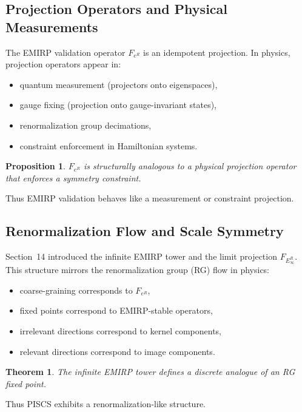 \documentclass[11pt]{article}
\theoremstyle{definition}
\theoremstyle{plain}
\newtheorem{theorem}[definition]{Theorem}
\newtheorem{proposition}[definition]{Proposition}
\theoremstyle{remark}
\begin{document}
\subsection{Projection Operators and Physical Measurements}

The EMIRP validation operator $F_{e^R}$ is an idempotent projection. In
physics, projection operators appear in:

\begin{itemize}
    \item quantum measurement (projectors onto eigenspaces),
    \item gauge fixing (projection onto gauge-invariant states),
    \item renormalization group decimations,
    \item constraint enforcement in Hamiltonian systems.
\end{itemize}

\begin{proposition}
$F_{e^R}$ is structurally analogous to a physical projection operator
that enforces a symmetry constraint.
\end{proposition}

Thus EMIRP validation behaves like a measurement or constraint
projection.

\subsection{Renormalization Flow and Scale Symmetry}

Section~14 introduced the infinite EMIRP tower and the limit projection
$F_{E_\infty^R}$. This structure mirrors the renormalization group (RG)
flow in physics:

\begin{itemize}
    \item coarse-graining corresponds to $F_{e^R}$,
    \item fixed points correspond to EMIRP-stable operators,
    \item irrelevant directions correspond to kernel components,
    \item relevant directions correspond to image components.
\end{itemize}

\begin{theorem}
The infinite EMIRP tower defines a discrete analogue of an RG fixed
point.
\end{theorem}

Thus PISCS exhibits a renormalization-like structure.
\end{document}
